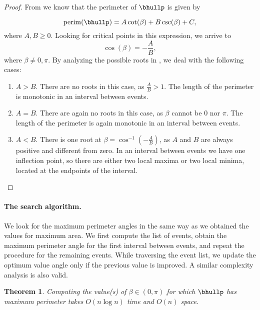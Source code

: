 \documentclass[11pt,letterpaper,english]{article}
\newtheorem{theorem}{Theorem}
\theoremstyle{definition}
\newcommand{\perim}{\operatorname{perim}}
\begin{document}
\begin{proof}
  From  we know that the perimeter of
  $\bhullp$ is given by

  \begin{equation*}
    \perim(\bhullp) = A \cot(\beta) + B \csc(\beta) + C,
  \end{equation*}
  where $A,B \geq 0$. Looking for critical points in this expression,
  we arrive to
  \begin{equation}\label{apps:perim:eqn:derivative}
    \cos (\beta) = - \frac{A}{B},
  \end{equation}
  where $\beta \neq 0,\pi$.
By analyzing the possible roots in ,
  we deal with the following cases:
  \begin{enumerate}
  \item $A > B$. There are no roots in this case, as
    $\frac{A}{B} > 1$. The length of the perimeter is monotonic in an interval
    between events.
  \item $A = B$. There are again no roots in this case, as $\beta$
    cannot be $0$ nor $\pi$. The length of the perimeter is again monotonic in an
    interval between events.
  \item $A < B$. There is one root at
    $\beta = \cos^{-1}(-\frac{A}{B})$, as $A$ and $B$ are always
    positive and different from zero. In an interval between events we
    have one inflection point, so there are either two local maxima
    or two local minima, located at the endpoints of the interval.
  \end{enumerate}
\end{proof}

\paragraph{The search algorithm.}

We look for the maximum perimeter angles in the same way as we
obtained the values for maximum area. We first compute the list of
events, obtain the maximum perimeter angle for the first interval
between events, and repeat the procedure for the remaining
events. While traversing the event list, we update the optimum value
angle only if the previous value is improved. A similar complexity
analysis is also valid.

\begin{theorem}
  Computing the value(s) of $\beta \in (0, \pi)$ for which $\bhullp$
  has maximum perimeter takes $O(n\log n)$ time and $O(n)$
  space.
\end{theorem}
\end{document}
